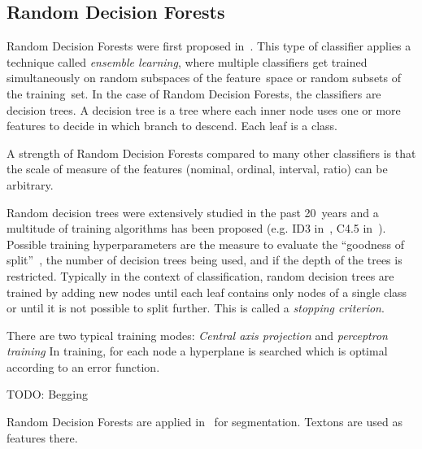 \subsection{Random Decision Forests}\label{subsec:random-forests}
Random Decision Forests were first proposed in~\cite{ho1995random}. This type
of classifier applies a technique called \textit{ensemble learning}, where
multiple classifiers get trained simultaneously on random subspaces of the
feature~space or random subsets of the training~set. In the case of Random
Decision Forests, the classifiers are decision trees. A decision tree is a tree
where each inner node uses one or more features to decide in which branch to
descend. Each leaf is a class.

A strength of Random Decision Forests compared to many other classifiers is
that the scale of measure of the features (nominal, ordinal, interval, ratio)
can be arbitrary.

Random decision trees were extensively studied in the past 20~years and a
multitude of training algorithms has been proposed (e.g. ID3
in~\cite{quinlan1986induction}, C4.5 in~\cite{quinlan2014c4}). Possible
training hyperparameters are the measure to evaluate the \enquote{goodness of
split}~\cite{raey89empirical}, the number of decision trees being used, and if
the depth of the trees is restricted. Typically in the context of
classification, random decision trees are trained by adding new nodes until
each leaf contains only nodes of a single class or until it is not possible to
split further. This is called a \textit{stopping criterion}.

There are two typical training modes: \textit{Central axis projection} and
\textit{perceptron training} In training, for each node a hyperplane is
searched which is optimal according to an error function.

TODO: Begging

Random Decision Forests are applied in~\cite{shotton2008semantic} for
segmentation. Textons are used as features there.
